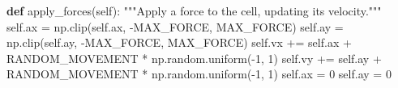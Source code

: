 \documentclass[
  letterpaper,
  DIV=11,
  numbers=noendperiod]{scrreprt}
\newenvironment{Shaded}{\begin{snugshade}}{\end{snugshade}}
\newcommand{\CommentTok}[1]{\textcolor[rgb]{0.37,0.37,0.37}{#1}}
\newcommand{\DecValTok}[1]{\textcolor[rgb]{0.68,0.00,0.00}{#1}}
\newcommand{\KeywordTok}[1]{\textcolor[rgb]{0.00,0.23,0.31}{\textbf{#1}}}
\newcommand{\NormalTok}[1]{\textcolor[rgb]{0.00,0.23,0.31}{#1}}
\newcommand{\OperatorTok}[1]{\textcolor[rgb]{0.37,0.37,0.37}{#1}}
\newcommand{\VariableTok}[1]{\textcolor[rgb]{0.07,0.07,0.07}{#1}}
\theoremstyle{definition}
\theoremstyle{remark}
\begin{document}
\begin{tcolorbox}
\begin{Shaded}
\begin{Highlighting}[]
    \KeywordTok{def}\NormalTok{ apply\_forces(}\VariableTok{self}\NormalTok{):}
        \CommentTok{"""Apply a force to the cell, updating its velocity."""}
        \VariableTok{self}\NormalTok{.ax }\OperatorTok{=}\NormalTok{ np.clip(}\VariableTok{self}\NormalTok{.ax, }\OperatorTok{{-}}\NormalTok{MAX\_FORCE, MAX\_FORCE)}
        \VariableTok{self}\NormalTok{.ay }\OperatorTok{=}\NormalTok{ np.clip(}\VariableTok{self}\NormalTok{.ay, }\OperatorTok{{-}}\NormalTok{MAX\_FORCE, MAX\_FORCE)}
        \VariableTok{self}\NormalTok{.vx }\OperatorTok{+=} \VariableTok{self}\NormalTok{.ax }\OperatorTok{+}\NormalTok{ RANDOM\_MOVEMENT }\OperatorTok{*}\NormalTok{ np.random.uniform(}\OperatorTok{{-}}\DecValTok{1}\NormalTok{, }\DecValTok{1}\NormalTok{)}
        \VariableTok{self}\NormalTok{.vy }\OperatorTok{+=} \VariableTok{self}\NormalTok{.ay }\OperatorTok{+}\NormalTok{ RANDOM\_MOVEMENT }\OperatorTok{*}\NormalTok{ np.random.uniform(}\OperatorTok{{-}}\DecValTok{1}\NormalTok{, }\DecValTok{1}\NormalTok{)}
        \VariableTok{self}\NormalTok{.ax }\OperatorTok{=} \DecValTok{0}
        \VariableTok{self}\NormalTok{.ay }\OperatorTok{=} \DecValTok{0}
        



\end{Highlighting}
\end{Shaded}
\end{tcolorbox}
\end{document}
